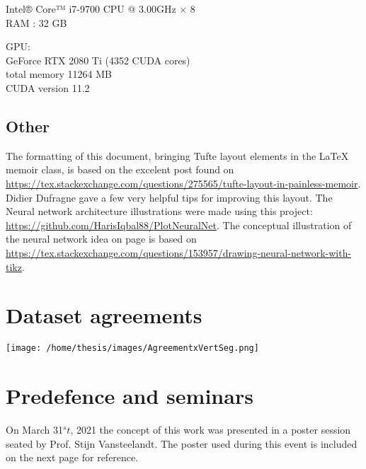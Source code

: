 Intel® Core™ i7-9700 CPU @ 3.00GHz $\times$ 8 \\
RAM : 32 GB

\textsc{GPU}:\\
\hspace{5mm}GeForce RTX 2080 Ti (4352 CUDA cores)\\
\hspace{5mm}total memory 11264 MB\\
\hspace{5mm}CUDA version 11.2



\section{Other}
The formatting of this document, bringing Tufte layout elements in the \LaTeX{} memoir class, is based on the excelent post found on \url{https://tex.stackexchange.com/questions/275565/tufte-layout-in-painless-memoir}.
Didier Dufragne gave a few very helpful tips for improving this layout.
The Neural network architecture illustrations were made using this project: \url{https://github.com/HarisIqbal88/PlotNeuralNet}.
The conceptual illustration of the neural network idea on page \pageref{fig:ann} is based on \url{https://tex.stackexchange.com/questions/153957/drawing-neural-network-with-tikz}.



\chapter{Dataset agreements\label{seg:datasetagreement}}

\texttt{[image: /home/thesis/images/AgreementxVertSeg.png]}

\chapter{Predefence and seminars}
\par{
  On March 31$^st$, 2021 the concept of this work was presented in a poster session seated by Prof. Stijn Vansteelandt.
The poster used during this event is included on the next page for reference.
}





